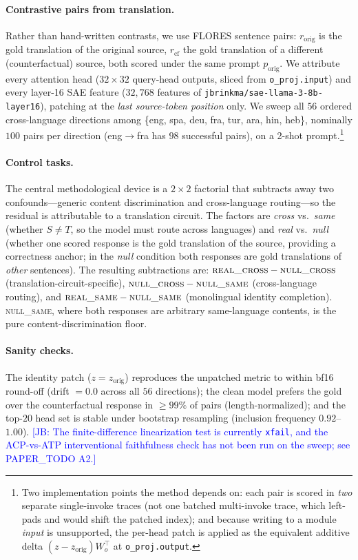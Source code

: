 \documentclass[11pt]{article}
\newcommand{\jb}[1]{\textcolor{blue}{[JB: #1]}} %
\begin{document}
\paragraph{Contrastive pairs from translation.} Rather than hand-written
contrasts, we use FLORES sentence pairs: $r_{\text{orig}}$ is the gold
translation of the original source, $r_{\text{cf}}$ the gold translation of a
different (counterfactual) source, both scored under the same prompt
$p_{\text{orig}}$. We attribute every attention head ($32\times32$ query-head
outputs, sliced from \texttt{o\_proj.input}) and every layer-16 SAE feature
($32{,}768$ features of \texttt{jbrinkma/sae-llama-3-8b-layer16}), patching at
the \emph{last source-token position} only. We sweep all $56$ ordered
cross-language directions among
\{eng, spa, deu, fra, tur, ara, hin, heb\}, nominally $100$ pairs per direction
(eng$\to$fra has $98$ successful pairs), on a 2-shot prompt.\footnote{Two
implementation points the method depends on: each
pair is scored in \emph{two} separate single-invoke traces (not one batched
multi-invoke trace, which left-pads and would shift the patched index); and
because writing to a module \emph{input} is unsupported, the per-head patch is
applied as the equivalent additive delta $(z-z_{\text{orig}})W_o^{\!\top}$ at
\texttt{o\_proj.output}.}

\paragraph{Control tasks.} The central methodological device is a $2\times2$
factorial that subtracts away two confounds---generic content discrimination
and cross-language routing---so the residual is attributable to a translation
circuit. The factors are \emph{cross} vs.\ \emph{same} (whether $S\!\neq\!T$, so
the model must route across languages) and \emph{real} vs.\ \emph{null} (whether
one scored response is the gold translation of the source, providing a
correctness anchor; in the \emph{null} condition both responses are gold
translations of \emph{other} sentences). The resulting subtractions are:
$\textsc{real\_cross}-\textsc{null\_cross}$ (translation-circuit-specific),
$\textsc{null\_cross}-\textsc{null\_same}$ (cross-language routing), and
$\textsc{real\_same}-\textsc{null\_same}$ (monolingual identity completion).
\textsc{null\_same}, where both responses are arbitrary same-language contents,
is the pure content-discrimination floor.

\paragraph{Sanity checks.} The identity patch ($z=z_{\text{orig}}$) reproduces
the unpatched metric to within bf16 round-off (drift $=0.0$ across all $56$
directions); the clean model prefers the gold over the counterfactual response
in $\geq99\%$ of pairs (length-normalized); and the top-$20$ head set is stable
under bootstrap resampling (inclusion frequency $0.92$--$1.00$). \jb{The
finite-difference linearization test is currently \texttt{xfail}, and the
ACP-vs-ATP interventional faithfulness check has not been run on the sweep; see
PAPER\_TODO A2.}
\end{document}
